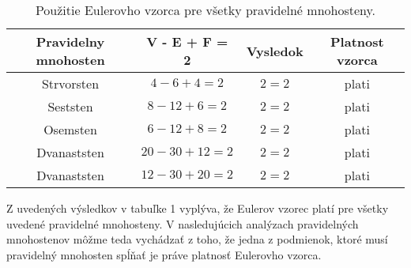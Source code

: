 	\begin{table}[h]
		\caption{Použitie Eulerovho vzorca pre všetky pravidelné mnohosteny.}
		\label{tab 1}
		\begin{tabular}{|c|c|c|c|}
			\hline
			\textbf{Pravidelny mnohosten}&\textbf{V - E + F = 2}&\textbf{Vysledok}&\textbf{Platnost vzorca}\\ \hline
			Strvorsten&$4 - 6 + 4 = 2$&$2 = 2$&{\color{green}plati} \\ \hline
			Seststen&$8 - 12 + 6 = 2$&$2 = 2$&{\color{green}plati} \\ \hline
			Osemsten&$6 - 12 + 8 = 2$&$2 = 2$&{\color{green}plati} \\ \hline
			Dvanaststen&$20 - 30 + 12 = 2$&$2 = 2$&{\color{green}plati} \\ \hline
			Dvanaststen&$12 - 30 + 20 = 2$&$2 = 2$&{\color{green}plati} \\ \hline
		\end{tabular}
	\end{table}
\noindent
Z uvedených výsledkov v tabuľke 1 vyplýva, že Eulerov vzorec platí pre všetky uvedené pravidelné mnohosteny. V nasledujúcich analýzach pravidelných mnohostenov môžme teda vychádzať z toho, že jedna z podmienok, ktoré musí pravidelný mnohosten spĺňať je práve platnosť Eulerovho vzorca.